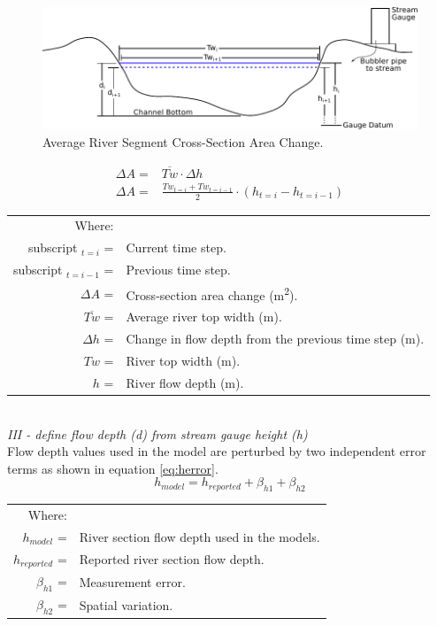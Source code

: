 \begin{linenumbers}
\begin{figure}[htbp]
\begin{center}
	\includegraphics[width=6in]{Figures/LineDiagram/XSection}
	\caption[Average River Segment Cross-Section Area Change.]{Average River Segment Cross-Section Area Change.}
	\label{fig:XSArea}
\end{center}
\end{figure}

\begin{align}
	\Delta A= & \overline{Tw}\cdot \Delta h \nonumber \\
	\Delta A= & \frac{Tw_{t=i} + Tw_{t=i-1}}{2} \cdot \left( h_{t=i} - h_{t=i-1} \right) \label{eq:XSArea}
\end{align}
\begin{tabular}{rl}
	Where: & \\
	subscript $_{t=i}$ = & Current time step. \\
	subscript $_{t=i-1}$ = & Previous time step. \\
	$\Delta A$ = & Cross-section area change (\si{\meter\squared}).\\
	$\overline{Tw}$ = & Average river top width (\si{\meter}).\\
	$\Delta h$ = & Change in flow depth from the previous time step (\si{\meter}). \\
	$Tw$ = & River top width (\si{\meter}). \\
	$h$ = & River flow depth (\si{\meter}). \\
\end{tabular}\\

\emph{III - define flow depth (d) from stream gauge height (h)}\\
Flow depth values used in the model are perturbed by two independent error terms as shown in equation \ref{eq:herror}.
\begin{equation}
	h_{model}=h_{reported}+\beta_{h1}+\beta_{h2}
	\label{eq:herror}
\end{equation}
\begin{tabular}{rl}
	Where: & \\
	$h_{model}$ = & River section flow depth used in the models.\\
	$h_{reported}$ = & Reported river section flow depth.\\
	$\beta_{h1}$ = & Measurement error.\\
	$\beta_{h2}$ = & Spatial variation.\\
\end{tabular}\\


\end{linenumbers}
